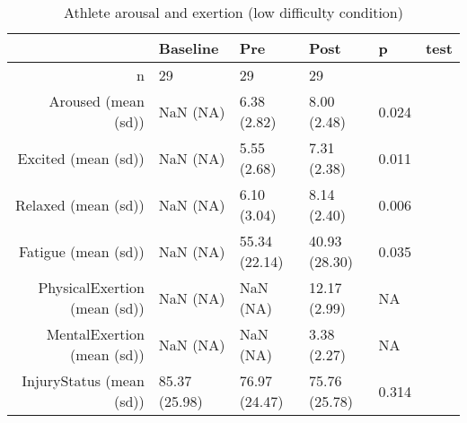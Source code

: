\begin{table}[ht]
\centering
\begin{tabular}{rlllll}
  \hline
 & Baseline & Pre & Post & p & test \\ 
  \hline
n &    29 &    29 &    29 &  &  \\ 
  Aroused (mean (sd)) &   NaN (NA) &  6.38 (2.82) &  8.00 (2.48) &  0.024 &  \\ 
  Excited (mean (sd)) &   NaN (NA) &  5.55 (2.68) &  7.31 (2.38) &  0.011 &  \\ 
  Relaxed (mean (sd)) &   NaN (NA) &  6.10 (3.04) &  8.14 (2.40) &  0.006 &  \\ 
  Fatigue (mean (sd)) &   NaN (NA) & 55.34 (22.14) & 40.93 (28.30) &  0.035 &  \\ 
  PhysicalExertion (mean (sd)) &   NaN (NA) &   NaN (NA) & 12.17 (2.99) &  NA &  \\ 
  MentalExertion (mean (sd)) &   NaN (NA) &   NaN (NA) &  3.38 (2.27) &  NA &  \\ 
  InjuryStatus (mean (sd)) & 85.37 (25.98) & 76.97 (24.47) & 75.76 (25.78) &  0.314 &  \\ 
   \hline
\end{tabular}
\caption{Athlete arousal and exertion 
 (low difficulty condition)} 
\end{table}
